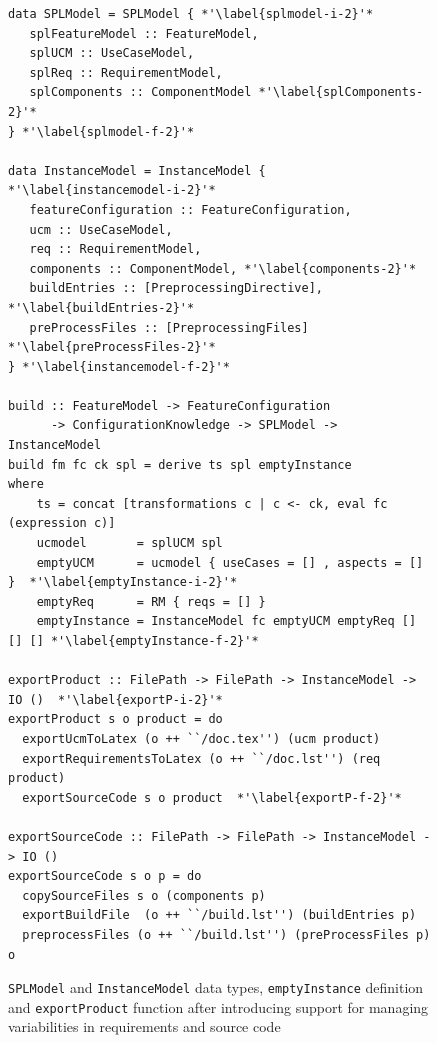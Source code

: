 \begin{figure}
\begin{lstlisting}
data SPLModel = SPLModel { *'\label{splmodel-i-2}'*
   splFeatureModel :: FeatureModel,
   splUCM :: UseCaseModel,
   splReq :: RequirementModel,
   splComponents :: ComponentModel *'\label{splComponents-2}'*
} *'\label{splmodel-f-2}'*

data InstanceModel = InstanceModel { *'\label{instancemodel-i-2}'*
   featureConfiguration :: FeatureConfiguration,
   ucm :: UseCaseModel,
   req :: RequirementModel,
   components :: ComponentModel, *'\label{components-2}'*
   buildEntries :: [PreprocessingDirective], *'\label{buildEntries-2}'*
   preProcessFiles :: [PreprocessingFiles] *'\label{preProcessFiles-2}'*
} *'\label{instancemodel-f-2}'*

build :: FeatureModel -> FeatureConfiguration 
      -> ConfigurationKnowledge -> SPLModel -> InstanceModel
build fm fc ck spl = derive ts spl emptyInstance
where
    ts = concat [transformations c | c <- ck, eval fc (expression c)]
    ucmodel       = splUCM spl
    emptyUCM      = ucmodel { useCases = [] , aspects = [] }  *'\label{emptyInstance-i-2}'*
    emptyReq      = RM { reqs = [] }
    emptyInstance = InstanceModel fc emptyUCM emptyReq [] [] [] *'\label{emptyInstance-f-2}'*

exportProduct :: FilePath -> FilePath -> InstanceModel -> IO ()  *'\label{exportP-i-2}'*
exportProduct s o product = do
  exportUcmToLatex (o ++ ``/doc.tex'') (ucm product)
  exportRequirementsToLatex (o ++ ``/doc.lst'') (req product)
  exportSourceCode s o product  *'\label{exportP-f-2}'*

exportSourceCode :: FilePath -> FilePath -> InstanceModel -> IO ()
exportSourceCode s o p = do
  copySourceFiles s o (components p)
  exportBuildFile  (o ++ ``/build.lst'') (buildEntries p)
  preprocessFiles (o ++ ``/build.lst'') (preProcessFiles p) o

\end{lstlisting}
\caption{\texttt{SPLModel} and \texttt{InstanceModel} data types, \texttt{emptyInstance} definition and \texttt{exportProduct} function
  after introducing support for managing variabilities in requirements and source code}
\label{fig:spl-model-with-req-and-code}
\end{figure}

